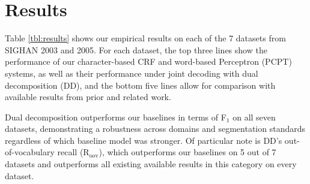 \section{Results}

Table \ref{tbl:results} shows our empirical results on each of the 7 datasets from SIGHAN 2003 and 2005. For each dataset, the top three lines show the performance of our character-based CRF and word-based Perceptron (PCPT) systems, as well as their performance under joint decoding with dual decomposition (DD), and the bottom five lines allow for comparison with available results from prior and related work.

Dual decomposition outperforms our baselines in terms of F$_1$ on all seven datasets, demonstrating a robustness across domains and segmentation standards regardless of which baseline model was stronger. Of particular note is DD's out-of-vocabulary recall (R$_{\mathrm{oov}}$), which outperforms our baselines on 5 out of 7 datasets and outperforms all existing available results in this category on every dataset. 



%

